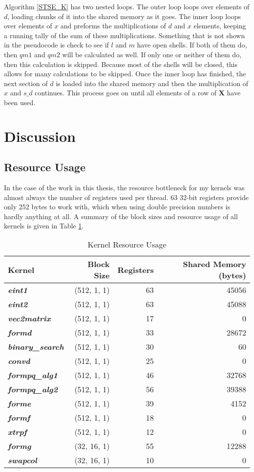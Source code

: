 \documentclass[12pt]{report}
\newcommand{\kernel}[1]{\textit{\textbf{#1}}}
\begin{document}
Algorithm \ref{STSE_K} has two nested loops. The outer loop loops over elements of $d$, loading chunks of it into the shared memory as it goes. The inner loop loops over elements of $x$ and preforms the multiplications of $d$ and $x$ elements, keeping a running tally of the sum of these multiplications. Something that is not shown in the pseudocode is check to see if $l$ and $m$ have open shells. If both of them do, then $qm1$ and $qm2$ will be calculated as well. If only one or neither of them do, then this calculation is skipped. Because most of the shells will be closed, this allows for many calculations to be skipped. Once the inner loop has finished, the next section of $d$ is loaded into the shared memory and then the multiplication of $x$ and $s\_d$ continues. This process goes on until all elements of a row of \textbf{X} have been used.

\section{Discussion}
\subsection{Resource Usage}
In the case of the work in this thesis, the resource bottleneck for my kernels was almost always the number of registers used per thread. 63 32-bit registers provide only 252 bytes to work with, which when using double precision numbers is hardly anything at all. A summary of the block sizes and resource usage of all kernels is given in Table \ref{tab:resources}.

\begin{table}[h!]
\caption{Kernel Resource Usage}
\label{tab:resources}
\begin{tabular}{lrrr}
	Kernel				&	Block Size		&	Registers	&	Shared Memory (bytes)	\\
	\hline
	\kernel{eint1}			&	(512, 1, 1)		&	63		&	45056				\\
	\kernel{eint2}			&	(512, 1, 1)		&	63		&	45088				\\
	\kernel{vec2matrix}		&	(512, 1, 1)		&	17		&	0					\\
	\kernel{formd}			&	(512, 1, 1)		&	33		&	28672				\\
	\kernel{binary\_search}	&	(512, 1, 1)		&	30		&	60					\\
	\kernel{convd}			&	(512, 1, 1)		&	25		&	0					\\
	\kernel{formpq\_alg1}	&	(512, 1, 1)		&	46		&	32768				\\
	\kernel{formpq\_alg2}	&	(512, 1, 1)		&	56		&	39388				\\
	\kernel{forme}			&	(512, 1, 1)		&	39		&	4152					\\
	\kernel{formf}			&	(512, 1, 1)		&	18		&	0					\\
	\kernel{xtrpf}			&	(512, 1, 1)		&	12		&	0					\\
	\kernel{formg}			&	(32, 16, 1)		&	55		&	12288				\\
	\kernel{swapcol}		&	(32, 16, 1)		&	10		&	0					\\
\end{tabular}
\end{table}
\end{document}
